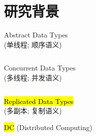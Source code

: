 
\section{研究背景}

\begin{frame}{}
  \begin{center}
    {\large Abstract Data Types}  \\[8pt]

    (单线程; 顺序语义)
  \end{center}

  \begin{columns}
    \pause
  \end{columns}
\end{frame}

\begin{frame}{}
  \begin{center}
    {\large Concurrent Data Types}  \\[8pt]

    (多线程; 并发语义)
  \end{center}

  \begin{columns}
    \pause

  \end{columns}
\end{frame}

\begin{frame}{}
  \begin{center}
    \hl{\large Replicated Data Types}   \\[8pt]

    (多副本; 复制语义)
  \end{center}

  \pause

  \pause
  \begin{center}
    \hl{\Large DC} {(Distributed Computing)}
  \end{center}
\end{frame}

